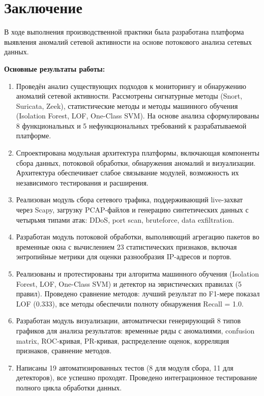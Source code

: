 \chapter*{Заключение}

В ходе выполнения производственной практики была разработана платформа выявления аномалий сетевой активности на основе потокового анализа сетевых данных.

\textbf{Основные результаты работы:}

\begin{enumerate}
    \item Проведён анализ существующих подходов к мониторингу и обнаружению аномалий сетевой активности. Рассмотрены сигнатурные методы (Snort, Suricata, Zeek), статистические методы и методы машинного обучения (Isolation Forest, LOF, One-Class SVM). На основе анализа сформулированы 8 функциональных и 5 нефункциональных требований к разрабатываемой платформе.

    \item Спроектирована модульная архитектура платформы, включающая компоненты сбора данных, потоковой обработки, обнаружения аномалий и визуализации. Архитектура обеспечивает слабое связывание модулей, возможность их независимого тестирования и расширения.

    \item Реализован модуль сбора сетевого трафика, поддерживающий live-захват через Scapy, загрузку PCAP-файлов и генерацию синтетических данных с четырьмя типами атак: DDoS, port scan, bruteforce, data exfiltration.

    \item Разработан модуль потоковой обработки, выполняющий агрегацию пакетов во временные окна с вычислением 23 статистических признаков, включая энтропийные метрики для оценки разнообразия IP-адресов и портов.

    \item Реализованы и протестированы три алгоритма машинного обучения (Isolation Forest, LOF, One-Class SVM) и детектор на эвристических правилах (5 правил). Проведено сравнение методов: лучший результат по F1-мере показал LOF (0.333), все методы обеспечили полноту обнаружения Recall = 1.0.

    \item Разработан модуль визуализации, автоматически генерирующий 8 типов графиков для анализа результатов: временные ряды с аномалиями, confusion matrix, ROC-кривая, PR-кривая, распределение оценок, корреляция признаков, сравнение методов.

    \item Написаны 19 автоматизированных тестов (8 для модуля сбора, 11 для детекторов), все успешно проходят. Проведено интеграционное тестирование полного цикла обработки данных.
\end{enumerate}

